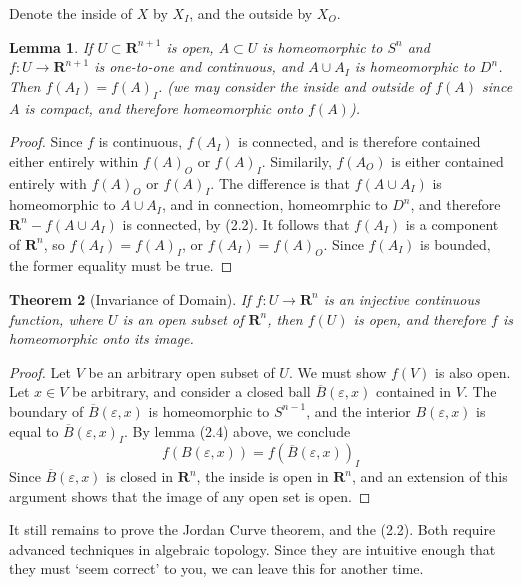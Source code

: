 \documentclass[12pt]{report}
\theoremstyle{plain}
\newtheorem{theorem}{Theorem}[chapter]
\newtheorem{lemma}[theorem]{Lemma}
\theoremstyle{definition}
\begin{document}
Denote the inside of $X$ by $X_I$, and the outside by $X_O$.

\begin{lemma}
    If $U \subset \mathbf{R}^{n+1}$ is open, $A \subset U$ is homeomorphic to $S^n$ and $f:U \to \mathbf{R}^{n+1}$ is one-to-one and continuous, and $A \cup A_I$ is homeomorphic to $D^n$. Then $f(A_I) = f(A)_I$. (we may consider the inside and outside of $f(A)$ since $A$ is compact, and therefore homeomorphic onto $f(A)$).
\end{lemma}
\begin{proof}
    Since $f$ is continuous, $f(A_I)$ is connected, and is therefore contained either entirely within $f(A)_O$ or $f(A)_I$. Similarily, $f(A_O)$ is either contained entirely with $f(A)_O$ or $f(A)_I$. The difference is that $f(A \cup A_I)$ is homeomorphic to $A \cup A_I$, and in connection, homeomrphic to $D^n$, and therefore $\mathbf{R}^n - f(A \cup A_I)$ is connected, by (2.2). It follows that $f(A_I)$ is a component of $\mathbf{R}^n$, so $f(A_I) = f(A)_I$, or $f(A_I) = f(A)_O$. Since $f(A_I)$ is bounded, the former equality must be true.
\end{proof}

\begin{theorem}[Invariance of Domain]
    If $f:U \to \mathbf{R}^n$ is an injective continuous function, where $U$ is an open subset of $\mathbf{R}^n$, then $f(U)$ is open, and therefore $f$ is homeomorphic onto its image.
\end{theorem}
\begin{proof}
    Let $V$ be an arbitrary open subset of $U$. We must show $f(V)$ is also open. Let $x \in V$ be arbitrary, and consider a closed ball $\overline{B}(\varepsilon, x)$ contained in $V$. The boundary of $\overline{B}(\varepsilon,x)$ is homeomorphic to $S^{n-1}$, and the interior $B(\varepsilon, x)$ is equal to $\overline{B}(\varepsilon,x)_I$. By lemma (2.4) above, we conclude
    \[ f(B(\varepsilon,x)) = f(\overline{B}(\varepsilon,x))_I \]
    Since $\overline{B}(\varepsilon,x)$ is closed in $\mathbf{R}^n$, the inside is open in $\mathbf{R}^n$, and an extension of this argument shows that the image of any open set is open.
\end{proof}

It still remains to prove the Jordan Curve theorem, and the (2.2). Both require advanced techniques in algebraic topology. Since they are intuitive enough that they must `seem correct' to you, we can leave this for another time.
\end{document}
